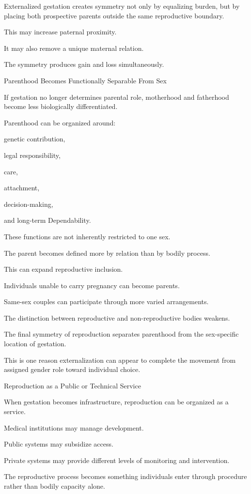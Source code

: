 Externalized gestation creates symmetry not only by equalizing burden, but by placing both prospective parents outside the same reproductive boundary.

This may increase paternal proximity.

It may also remove a unique maternal relation.

The symmetry produces gain and loss simultaneously.

Parenthood Becomes Functionally Separable From Sex

If gestation no longer determines parental role, motherhood and fatherhood become less biologically differentiated.

Parenthood can be organized around:

genetic contribution,

legal responsibility,

care,

attachment,

decision-making,

and long-term Dependability.

These functions are not inherently restricted to one sex.

The parent becomes defined more by relation than by bodily process.

This can expand reproductive inclusion.

Individuals unable to carry pregnancy can become parents.

Same-sex couples can participate through more varied arrangements.

The distinction between reproductive and non-reproductive bodies weakens.

The final symmetry of reproduction separates parenthood from the sex-specific location of gestation.

This is one reason externalization can appear to complete the movement from assigned gender role toward individual choice.

Reproduction as a Public or Technical Service

When gestation becomes infrastructure, reproduction can be organized as a service.

Medical institutions may manage development.

Public systems may subsidize access.

Private systems may provide different levels of monitoring and intervention.

The reproductive process becomes something individuals enter through procedure rather than bodily capacity alone.

